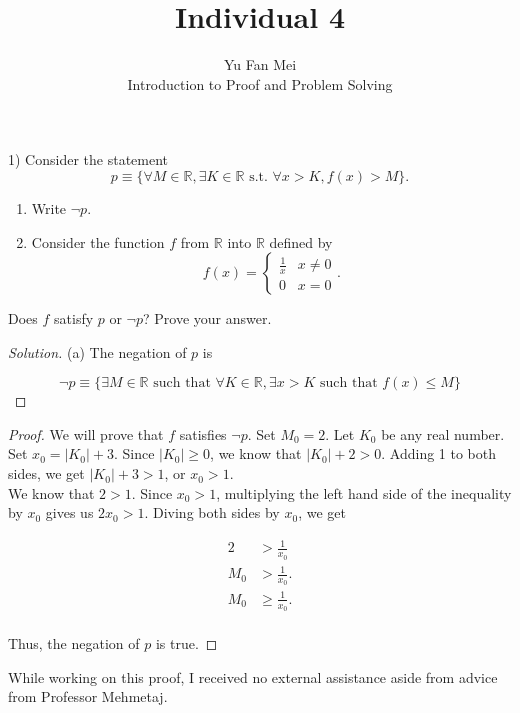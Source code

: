 \documentclass[12pt]{article}
\newenvironment{problem}[2][Problem]{\begin{trivlist}
\item[\hskip \labelsep {\bfseries #1}\hskip \labelsep {\bfseries #2.}]}{\end{trivlist}}
\newenvironment{solution}
               {\let\oldqedsymbol=\qedsymbol
                \renewcommand{\qedsymbol}{$\blacktriangleleft$}
                \begin{proof}[\textit\upshape Solution]}
               {\end{proof}
                \renewcommand{\qedsymbol}{\oldqedsymbol}}
\begin{document}

\title{Individual 4}%
\author{Yu Fan Mei\\ %
	Introduction to Proof and Problem Solving} %

\maketitle

\begin{problem}{12} %
    (1) Consider the statement
    $$p \equiv \{\forall M \in \mathbb{R}, \exists K \in \mathbb{R}\,\, \text{s.t.} \,\,\forall x > K,
    f(x) > M\}.$$
    \begin{enumerate}
    \item[(a)] Write $\neg p$.
    \item[(b)] Consider the function $f$ from $\mathbb{R}$ into $\mathbb{R}$ defined by
    $$f(x) = \begin{cases}
    \frac{1}{x} & x \neq 0\\
    0 & x = 0
    \end{cases}.$$
    \end{enumerate}
    Does $f$ satisfy $p$ or $\neg p$? Prove your answer.
    

\end{problem}

\begin{solution}

    (a) The negation of $p$ is

    $$\lnot p \equiv \{ \exists M \in \mathbb{R} \text{ such that } \forall K \in \mathbb{R}, \exists x > K \text{ such that } f(x) \leq M\}$$
\end{solution}

\begin{proof}
    
    We will prove that $f$ satisfies $\lnot p.$ Set $M_0 = 2$. Let $K_0$ be any real number. Set $x_0 = |K_0| + 3$. Since $|K_0| \geq 0$, we know that $|K_0| + 2 > 0$. Adding 1 to both sides, we get $|K_0| + 3 > 1$, or $x_0 > 1$. \\
    
    \noindent We know that $2 > 1$. Since $x_0 > 1$, multiplying the left hand side of the inequality by $x_0$ gives us $2x_0 > 1$. Diving both sides by $x_0$, we get

    \begin{align*}
        2 & > \frac{1}{x_0} \\
        M_0 & > \frac{1}{x_0}. \\
        M_0 & \geq \frac{1}{x_0}. \\
    \end{align*}
    
    Thus, the negation of $p$ is true.
\end{proof}


\noindent While working on this proof, I received no external assistance aside from advice from Professor Mehmetaj.
\end{document}
